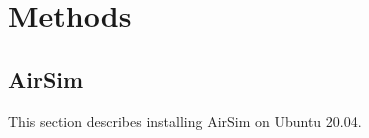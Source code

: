 \chapter{Methods} %
\label{Appendix-methods} 

\section{AirSim}

This section describes installing AirSim on Ubuntu 20.04.

